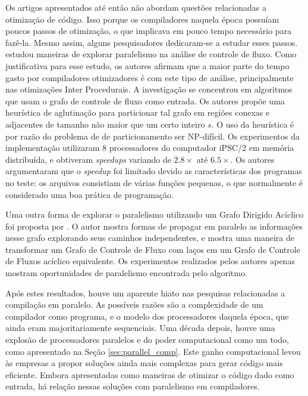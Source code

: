 Os artigos apresentados até então não abordam questões relacionadas
a otimização de código. Isso porque os compiladores naquela época possuíam poucos
passos de otimização, o que implicava em pouco tempo necessário para fazê-la.
Mesmo assim, alguns pesquisadores dedicaram-se a estudar esses passos.
\cite{Lee1994} estudou maneiras de explorar paralelismo na análise de controle
de fluxo. Como justificativa para esse estudo, os autores afirmam que a maior parte
do tempo gasto por compiladores otimizadores é com este tipo de análise,
principalmente nas otimizações Inter Procedurais. 
A investigação se concentrou em algoritmos que usam o grafo de controle
de fluxo como entrada. Os autores propõe uma heurística de aglutinação
para particionar tal grafo em regiões conexas e adjacentes de tamanho não maior
que um certo inteiro $s$. O uso da heurística é por razão do problema de
de particionamento ser NP-difícil.
Os experimentos da implementação utilizaram
8 processadores do computador iPSC/2 em memória distribuída, e 
obtiveram \textit{speedups} variando de
$2.8 \times$ até $6.5\times$. Os autores argumentaram que o \textit{speedup} foi
limitado devido as características dos programas no teste: os arquivos consistiam
de várias funções pequenas, o que normalmente é considerado uma boa prática de
programação.

Uma outra forma de explorar o paralelismo utilizando um Grafo Dirigido Acíclico
foi proposta por \cite{kramer1994combining}. O autor mostra formas de propagar
em paralelo as informações nesse grafo explorando seus caminhos independentes,
e mostra uma maneira de transformar um Grafo de Controle de Fluxo com laços em
um Grafo de Controle de Fluxos acíclico equivalente. Os experimentos realizados
pelos autores apenas mostram oportunidades de paralelismo encontrada pelo
algoritmo.

Após estes resultados, houve um aparente hiato nas pesquisas relacionadas a
compilação em paralelo. As possíveis razões são a complexidade de um compilador
como programa, e o modelo dos processadores daquela época, que ainda eram
majoritariamente sequenciais. Uma década depois, houve uma explosão de processadores
paralelos e do poder computacional como um todo, como apresentado na Seção
\ref{sec:parallel_comp}. Este ganho computacional levou às empresas a propor soluções
ainda mais complexas para
gerar código mais eficiente. Embora apresentadas como maneiras de otimizar o código
dado como entrada, há relação nessas soluções com paralelismo em compiladores.

